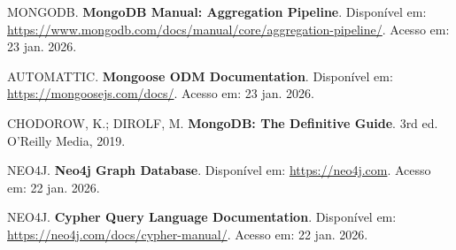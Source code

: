 \documentclass[12pt,a4paper]{article}
\begin{document}
MONGODB. \textbf{MongoDB Manual: Aggregation Pipeline}. Disponível em: \url{https://www.mongodb.com/docs/manual/core/aggregation-pipeline/}. Acesso em: 23 jan. 2026.

AUTOMATTIC. \textbf{Mongoose ODM Documentation}. Disponível em: \url{https://mongoosejs.com/docs/}. Acesso em: 23 jan. 2026.

CHODOROW, K.; DIROLF, M. \textbf{MongoDB: The Definitive Guide}. 3rd ed. O'Reilly Media, 2019.

NEO4J. \textbf{Neo4j Graph Database}. Disponível em: \url{https://neo4j.com}. Acesso em: 22 jan. 2026.

NEO4J. \textbf{Cypher Query Language Documentation}. Disponível em: \url{https://neo4j.com/docs/cypher-manual/}. Acesso em: 22 jan. 2026.
\end{document}
